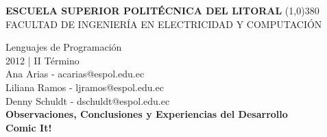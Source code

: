 \documentclass[12pt]{report}
\begin{document}
	\setlength{\topmargin}{-0.5in}
	\pagestyle{empty}
	\begin{center}
		\textbf{
			\vspace{-0.7em}
			ESCUELA SUPERIOR POLITÉCNICA DEL LITORAL
		}
		\line(1,0){380}\\		
		\scriptsize{FACULTAD DE INGENIERÍA EN ELECTRICIDAD Y COMPUTACIÓN}
	\end{center}
	\begin{center}
		\vspace{2.5em}
		Lenguajes de Programación
		\\2012 | II Término
		\vspace{1.5em}
		\\Ana Arias - acarias@espol.edu.ec
		\vspace{0.6mm}
		\\Liliana Ramos - ljramos@espol.edu.ec
		\\Denny Schuldt - dschuldt@espol.edu.ec
		\vspace{3em}
		\large{\textbf{\\ Observaciones, Conclusiones y Experiencias del Desarrollo	\vspace{2em}}}		
	\Huge{\textbf{\\ Comic It!	\vspace{1em}}}
\end{center}
		



	
\end{document}
